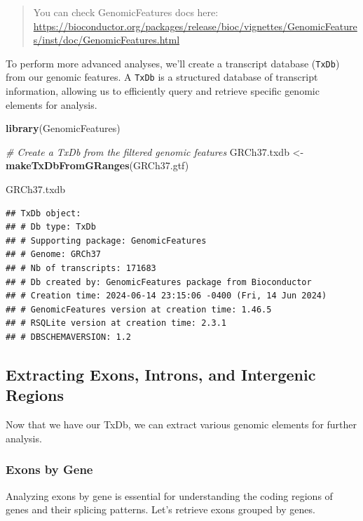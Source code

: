 \documentclass[
]{book}
\newenvironment{Shaded}{\begin{snugshade}}{\end{snugshade}}
\newcommand{\CommentTok}[1]{\textcolor[rgb]{0.56,0.35,0.01}{\textit{#1}}}
\newcommand{\FunctionTok}[1]{\textcolor[rgb]{0.13,0.29,0.53}{\textbf{#1}}}
\newcommand{\NormalTok}[1]{#1}
\newcommand{\OtherTok}[1]{\textcolor[rgb]{0.56,0.35,0.01}{#1}}
\begin{document}
\begin{quote}
You can check GenomicFeatures docs here: \url{https://bioconductor.org/packages/release/bioc/vignettes/GenomicFeatures/inst/doc/GenomicFeatures.html}
\end{quote}

To perform more advanced analyses, we'll create a transcript database (\texttt{TxDb}) from our genomic features. A \texttt{TxDb} is a structured database of transcript information, allowing us to efficiently query and retrieve specific genomic elements for analysis.

\begin{Shaded}
\begin{Highlighting}[]
\FunctionTok{library}\NormalTok{(GenomicFeatures)}

\CommentTok{\# Create a TxDb from the filtered genomic features}
\NormalTok{GRCh37.txdb }\OtherTok{\textless{}{-}} \FunctionTok{makeTxDbFromGRanges}\NormalTok{(GRCh37.gtf)}

\NormalTok{GRCh37.txdb}
\end{Highlighting}
\end{Shaded}

\begin{verbatim}
## TxDb object:
## # Db type: TxDb
## # Supporting package: GenomicFeatures
## # Genome: GRCh37
## # Nb of transcripts: 171683
## # Db created by: GenomicFeatures package from Bioconductor
## # Creation time: 2024-06-14 23:15:06 -0400 (Fri, 14 Jun 2024)
## # GenomicFeatures version at creation time: 1.46.5
## # RSQLite version at creation time: 2.3.1
## # DBSCHEMAVERSION: 1.2
\end{verbatim}

\hypertarget{extracting-exons-introns-and-intergenic-regions}{%
\subsection{Extracting Exons, Introns, and Intergenic Regions}\label{extracting-exons-introns-and-intergenic-regions}}

Now that we have our TxDb, we can extract various genomic elements for further analysis.

\hypertarget{exons-by-gene}{%
\subsubsection{Exons by Gene}\label{exons-by-gene}}

Analyzing exons by gene is essential for understanding the coding regions of genes and their splicing patterns. Let's retrieve exons grouped by genes.
\end{document}
